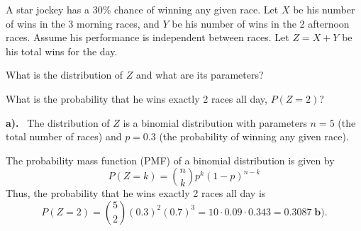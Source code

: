 \documentclass[a4paper, 10pt]{article}
\begin{document}
\begin{tosubmit}
\problem[7]
A star jockey has a 30\% chance of winning any given race.
Let \( X \) be his number of wins in the 3 morning races, and \( Y \) be his number of wins in the 2 afternoon races.
Assume his performance is independent between races.
Let \( Z = X + Y \) be his total wins for the day.

\begin{subproblems}
    \item What is the distribution of \( Z \) and what are its parameters?
    \item What is the probability that he wins exactly 2 races all day, \( P(Z = 2) \)?
\end{subproblems}

\par\noindent\submitsolution
\textbf{a).} \, The distribution of \( Z \) is a binomial distribution
with parameters \( n = 5 \) (the total number of races) and \( p = 0.3 \) (the probability of winning any given race).

\noindent The probability mass function (PMF) of a binomial distribution is given by
\[
    P(Z = k) = \binom{n}{k} p^k (1-p)^{n-k}
\]
Thus, the probability that he wins exactly 2 races all day is
\[
    P(Z = 2) = \binom{5}{2} (0.3)^2 (0.7)^3 = 10 \cdot 0.09 \cdot 0.343 = \boxed{0.3087} \; \textbf{b).}
\]
\end{tosubmit}
\end{document}
